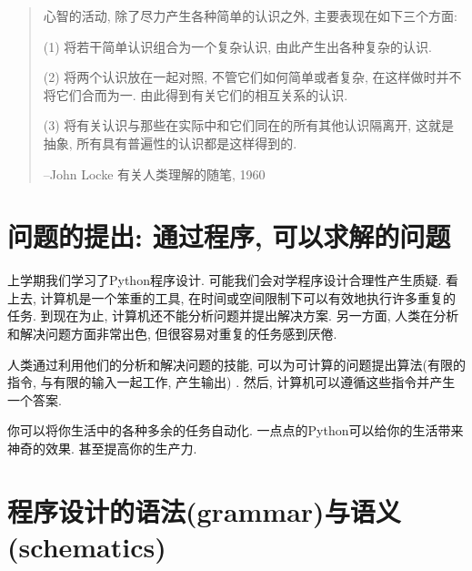 \begin{quote}
	心智的活动, 除了尽力产生各种简单的认识之外, 主要表现在如下三个方面:

(1) 将若干简单认识组合为一个复杂认识, 由此产生出各种复杂的认识. 

(2) 将两个认识放在一起对照, 不管它们如何简单或者复杂, 在这样做时并不将它们合而为一. 由此得到有关它们的相互关系的认识. 

(3) 将有关认识与那些在实际中和它们同在的所有其他认识隔离开, 这就是抽象, 所有具有普遍性的认识都是这样得到的. 

\hfill --John Locke 有关人类理解的随笔, 1960

\end{quote}

\section{问题的提出: 通过程序, 可以求解的问题}

上学期我们学习了Python程序设计. 可能我们会对学程序设计合理性产生质疑. 
看上去, 计算机是一个笨重的工具, 在时间或空间限制下可以有效地执行许多重复的任务. 到现在为止, 计算机还不能分析问题并提出解决方案. 另一方面,
人类在分析和解决问题方面非常出色, 但很容易对重复的任务感到厌倦. 

人类通过利用他们的分析和解决问题的技能, 可以为可计算的问题提出算法(有限的指令, 与有限的输入一起工作, 产生输出) . 然后,
计算机可以遵循这些指令并产生一个答案. 

你可以将你生活中的各种多余的任务自动化. 一点点的Python可以给你的生活带来神奇的效果. 甚至提高你的生产力. 

\section{程序设计的语法(grammar)与语义(schematics)}


